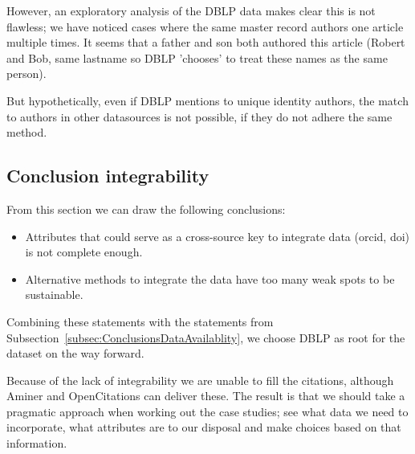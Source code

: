 \documentclass{ou-report}
\newcommand{\todo}[1]{{\color{red} TODO: #1}}
\begin{document}
However, an exploratory analysis of the DBLP data makes clear this is not 
flawless; we have noticed cases where the same master record authors one 
article multiple times. It seems that a father and son both authored this 
article (Robert and Bob, same lastname so DBLP 'chooses' to treat these names
as the same person).

But hypothetically, even if DBLP mentions to unique identity authors, 
the match to authors in other datasources is not possible, if they do 
not adhere the same method.





\subsection{Conclusion integrability}
From this section we can draw the following conclusions:
\begin{itemize}
    \item Attributes that could serve as a cross-source key to integrate data 
    (orcid, doi) is not complete enough.
    \item Alternative methods to integrate the data have too many weak spots to
    be sustainable.
\end{itemize}

Combining these statements with the statements from 
Subsection~\ref{subsec:ConclusionsDataAvailablity}, we choose DBLP as root for
the dataset on the way forward.

Because of the lack of integrability we are unable to fill the citations, 
although Aminer and OpenCitations can deliver these. The result is that we 
should take a pragmatic approach when working out the case studies; see what 
data we need to incorporate, what attributes are to our disposal and make 
choices based on that information.
\end{document}
